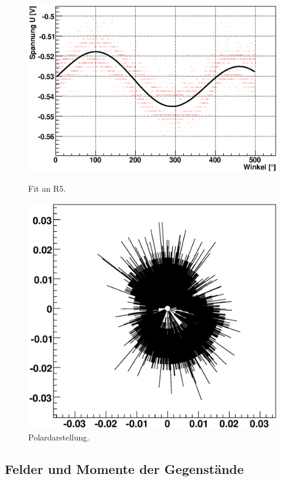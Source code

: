 \documentclass[12pt]{article}
\begin{document}
\begin{figure}[H]  
\begin{minipage}{0.49\linewidth}
\centering
\includegraphics[width=0.9\linewidth]{pictures/R5.eps}
\caption{Fit an R5.}
\end{minipage}
\begin{minipage}{0.5\linewidth}
\centering 
\includegraphics[width=0.9\linewidth]{pictures/R5vd.eps}
\caption{Polardarstellung.}
\end{minipage}
\end{figure}

\subsection{Felder und Momente der Gegenstände}
\end{document}
